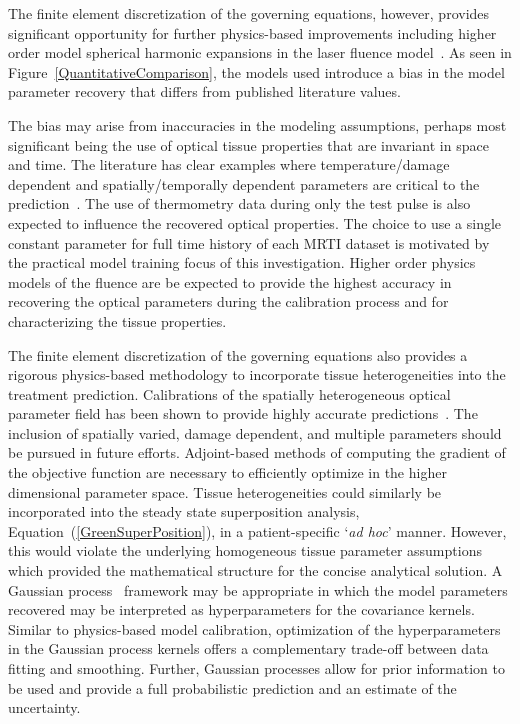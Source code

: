 \documentclass[12pt]{article}
\newcommand{\eqn}[1]{(\ref{#1})}
\begin{document}
The finite element discretization of the governing equations, however, 
provides significant opportunity for further
physics-based improvements including 
higher order model spherical harmonic expansions in the laser fluence 
model~\cite{carp2004radiative}. 
As seen in Figure~\ref{QuantitativeComparison}, the models used
introduce a bias in the model parameter
recovery that differs from published literature values.
{\color{red}The bias may arise from inaccuracies in the modeling assumptions, perhaps
most significant being the use of optical tissue properties that are
invariant in space and time. The literature has clear examples
where temperature/damage dependent and spatially/temporally dependent
parameters are critical to the
prediction~\cite{Mohammed05,Schutt2008}. The use of thermometry data during
only the test pulse is also expected to influence the recovered optical
properties.
The choice to use a single constant parameter for full time history of each
MRTI dataset is motivated by
the practical model training focus of this investigation.
Higher order physics
models of the fluence are be expected to provide the highest accuracy in
recovering the optical parameters during the calibration process and for
characterizing the tissue properties.


 }

The finite element discretization of the governing equations
also provides a rigorous physics-based methodology to 
incorporate tissue heterogeneities into the treatment prediction.
Calibrations of the spatially heterogeneous 
optical parameter field has been shown to provide highly accurate 
predictions~\cite{fuentes2013inverse}.
{\color{red} The inclusion of spatially varied, damage dependent, and
multiple parameters should be pursued in future efforts.}
Adjoint-based methods of computing the gradient of the objective 
function are necessary to efficiently optimize in the higher dimensional parameter space.
Tissue heterogeneities could similarly be incorporated
into the steady state superposition analysis, Equation~\eqn{GreenSuperPosition}, in a patient-specific
`\textit{ad hoc}' manner. However, this would violate the underlying homogeneous
tissue parameter assumptions which provided the mathematical
structure for the concise analytical solution.
A Gaussian process~\cite{rasmussen2006gaussian,Constantinescu2013} 
framework may be appropriate
in which the model parameters recovered may be interpreted as hyperparameters
for the covariance kernels.
Similar to physics-based model calibration, optimization of the
hyperparameters in the Gaussian process kernels offers a complementary
trade-off between data fitting and smoothing. Further, Gaussian processes allow
for prior information to be used and provide a full probabilistic prediction
and an estimate of the uncertainty. 
\end{document}
